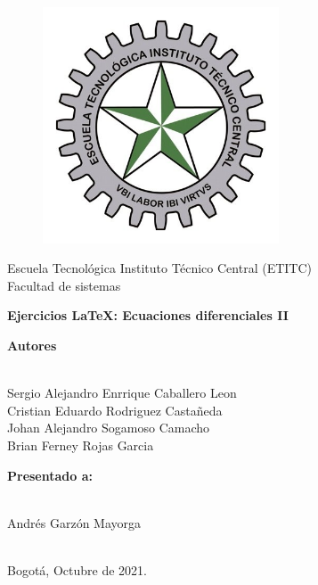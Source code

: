 \documentclass[a4paper,11pt, openany]{book}
\begin{document}
\begin{titlepage}
 
\begin{center}
\vspace*{-1in}
\begin{figure}[htb]
\begin{center}
\includegraphics[width=7cm]{ETITC.png}
\end{center}
\end{figure}
 
 
{\sc \huge Escuela Tecnológica Instituto Técnico Central (ETITC)}\\
\vspace*{0.15in}
Facultad de sistemas\\
\vspace*{0.6in}
\begin{Large}
\textbf{Ejercicios {\LaTeX}: Ecuaciones diferenciales II} \\
\end{Large}
\vspace*{0.3in}
\begin{large}
{\bf Autores} \\ 

\  

Sergio Alejandro Enrrique Caballero Leon\\ 
Cristian Eduardo Rodriguez Castañeda \\ 
Johan Alejandro Sogamoso Camacho \\ 
Brian Ferney Rojas Garcia

\end{large}
\vspace*{0.3in}
 
\end{center}
 
\begin{center}
{\bf Presentado a:} \\
 
\ 
 
Andrés Garzón Mayorga \\
 
\
 
Bogot{\'a}, Octubre de 2021.
\end{center}
 
\end{titlepage}
 
\end{document}
